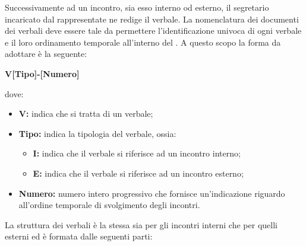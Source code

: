 				Successivamente ad un incontro, sia esso interno od esterno, il segretario incaricato dal rappresentate ne redige il verbale.
				\newline
				La nomenclatura dei documenti dei verbali deve essere tale da permettere l'identificazione univoca di ogni verbale e il loro ordinamento temporale all'interno del . A questo scopo la forma da adottare è la seguente:
				\begin{center}
					\textbf{V[Tipo]-[Numero]}
				\end{center}
				dove:
				\begin{itemize}
					\item \textbf{V:} indica che si tratta di un verbale;
					\item \textbf{Tipo:} indica la tipologia del verbale, ossia:
					\begin{itemize}
						\item \textbf{I:} indica che il verbale si riferisce ad un incontro interno;
						\item \textbf{E:} indica che il verbale si riferisce ad un incontro esterno;
					\end{itemize} 
					\item \textbf{Numero:} numero intero progressivo che fornisce un'indicazione riguardo all'ordine temporale di svolgimento degli incontri.
				\end{itemize}
				La struttura dei verbali è la stessa sia per gli incontri interni che per quelli esterni ed è formata dalle seguenti parti:
